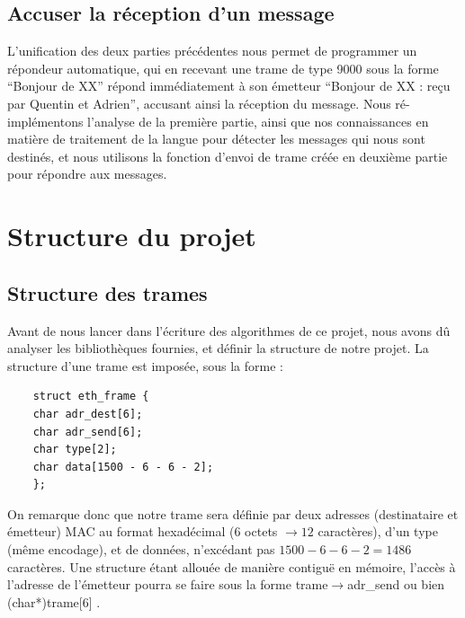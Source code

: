 \documentclass[a4paper,11pt]{article}
\begin{document}
	\subsection{Accuser la réception d'un message}
	L'unification des deux parties précédentes nous permet de programmer un répondeur automatique, qui en recevant une trame de type 9000 sous la forme ``Bonjour de XX'' répond immédiatement à son émetteur ``Bonjour de XX : reçu par Quentin et Adrien'', accusant ainsi la réception du message. Nous ré-implémentons l'analyse de la première partie, ainsi que nos connaissances en matière de traitement de la langue pour détecter les messages qui nous sont destinés, et nous utilisons la fonction d'envoi de trame créée en deuxième partie pour répondre aux messages.
	\section{Structure du projet}
	\subsection{Structure des trames}
	Avant de nous lancer dans l'écriture des algorithmes de ce projet, nous avons dû analyser les bibliothèques fournies, et définir la structure de notre projet. La structure d'une trame est imposée, sous la forme :
	\lstset{language=C}
	\begin{lstlisting}
	struct eth_frame {
	char adr_dest[6];
	char adr_send[6];
	char type[2];
	char data[1500 - 6 - 6 - 2];
	};
	\end{lstlisting}
	On remarque donc que notre trame sera définie par deux adresses (destinataire et émetteur) MAC au format hexadécimal ($ 6$ octets $\to 12$ caractères), d'un type (même encodage), et de données, n'excédant pas $1500-6-6-2=1486$ caractères. Une structure étant allouée de manière contiguë en mémoire, l'accès à l'adresse de l'émetteur pourra se faire sous la forme trame$\to$adr\_send ou bien (char*)trame[6] .
\end{document}

